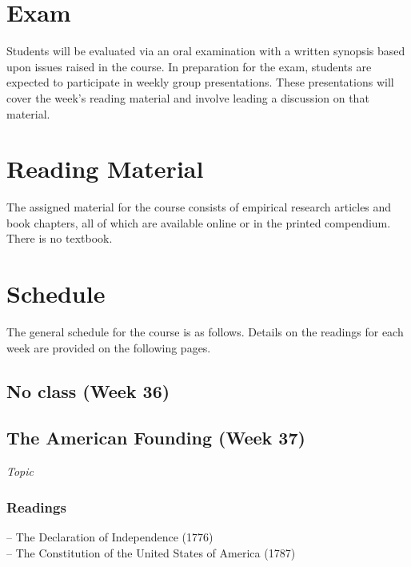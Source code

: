 \documentclass[12pt,a4paper]{article}
\begin{document}
\section{Exam}
Students will be evaluated via an oral examination with a written synopsis based upon issues raised in the course. In preparation for the exam, students are expected to participate in weekly group presentations. These presentations will cover the week's reading material and involve leading a discussion on that material.

\section{Reading Material}
The assigned material for the course consists of empirical research articles and book chapters, all of which are available online or in the printed compendium. There is no textbook.

\section{Schedule}
The general schedule for the course is as follows. Details on the readings for each week are provided on the following pages.

\secttoc


\clearpage


\subsection{No class (Week 36)}
\vspace{1em}


\clearpage
\subsection{The American Founding (Week 37)}
\emph{Topic}

\vspace{1em}
\subsubsection*{Readings}
-- The Declaration of Independence (1776)\\
-- The Constitution of the United States of America (1787)\\
\end{document}
